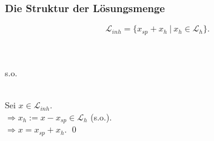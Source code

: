 \begin{frame}\frametitle{Die Struktur der Lösungsmenge}

	$$
 		\mathcal{L}_{inh} = \{ x_{sp} + x_h ~|~ x_h \in \mathcal{L}_{h} \}.
	$$
	
	\vspace{5mm}
	\\[1mm]
	
	\\[1mm] 
	s.o.\\[2mm]
	
	\pause
	
	\\[2mm]
	
	Sei $x \in \mathcal{L}_{inh}$.\\
	$\Rightarrow x_h := x - x_{sp} \in \mathcal{L}_{h}$ \quad (s.o.).\\
	$\Rightarrow  x = x_{sp} + x_h.$ 
	\qed
	
	\vfill
	
\end{frame}
%

